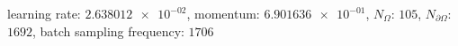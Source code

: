 learning rate: $\num[scientific-notation=true]{2.638012e-02}$, momentum: $\num[scientific-notation=true]{6.901636e-01}$, $N_{\Omega}$: $\num[scientific-notation=false]{105}$, $N_{\partial\Omega}$: $\num[scientific-notation=false]{1692}$, batch sampling frequency: $\num[scientific-notation=false]{1706}$